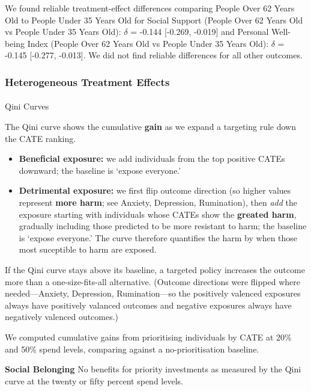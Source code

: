 \documentclass[
  single column]{article}
\makeatletter
\let\oldparagraph\paragraph
\renewcommand{\paragraph}{
    \@ifstar
      \xxxParagraphStar
      \xxxParagraphNoStar
  }
\newcommand{\xxxParagraphStar}[1]{\oldparagraph*{#1}\mbox{}}
\newcommand{\xxxParagraphNoStar}[1]{\oldparagraph{#1}\mbox{}}
\providecommand{\tightlist}{%
  \setlength{\itemsep}{0pt}\setlength{\parskip}{0pt}}
\makeatother
\begin{document}
We found reliable treatment-effect differences comparing People Over 62
Years Old to People Under 35 Years Old for Social Support (People Over
62 Years Old vs People Under 35 Years Old): \(\delta\) = -0.144
{[}-0.269, -0.019{]} and Personal Well-being Index (People Over 62 Years
Old vs People Under 35 Years Old): \(\delta\) = -0.145 {[}-0.277,
-0.013{]}. We did not find reliable differences for all other outcomes.

\newpage{}

\subsubsection{Heterogeneous Treatment
Effects}\label{results-qini-curve}

\paragraph{Qini Curves}\label{qini-curves}

The Qini curve shows the cumulative \textbf{gain} as we expand a
targeting rule down the CATE ranking.

\begin{itemize}
\tightlist
\item
  \textbf{Beneficial exposure:} we add individuals from the top positive
  CATEs downward; the baseline is `expose everyone.'
\item
  \textbf{Detrimental exposure:} we first flip outcome direction (so
  higher values represent \textbf{more harm}; see Anxiety, Depression,
  Rumination), then \emph{add} the exposure starting with individuals
  whose CATEs show the \textbf{greated harm}, gradually including those
  predicted to be more resistant to harm; the baseline is `expose
  everyone.' The curve therefore quantifies the harm by when those most
  suceptible to harm are exposed.
\end{itemize}

If the Qini curve stays above its baseline, a targeted policy increases
the outcome more than a one-size-fits-all alternative. (Outcome
directions were flipped where needed---Anxiety, Depression,
Rumination---so the positively valenced exposures always have positively
valanced outcomes and negative exposures always have negatively valenced
outcomes.)

We computed cumulative gains from prioritising individuals by CATE at
20\% and 50\% spend levels, comparing against a no-prioritisation
baseline.

\textbf{Social Belonging} No benefits for priority investments as
measured by the Qini curve at the twenty or fifty percent spend levels.
\end{document}
